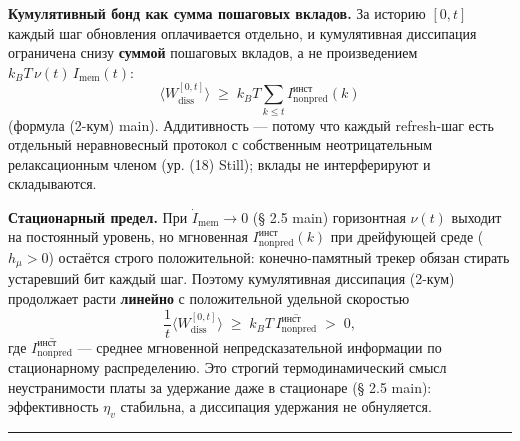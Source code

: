 \documentclass[pdflatex,sn-mathphys-ay]{sn-jnl}
\begin{document}
\textbf{Кумулятивный бонд как сумма пошаговых вкладов.} За историю \([0,t]\) каждый шаг обновления оплачивается отдельно, и кумулятивная диссипация ограничена снизу \textbf{суммой} пошаговых вкладов, а не произведением \(k_B T\,\nu(t)\, I_{\text{mem}}(t)\): \[\Big\langle W_{\text{diss}}^{[0,t]}\Big\rangle \;\ge\; k_B T \sum_{k \le t} I_{\text{nonpred}}^{\text{инст}}(k)\] (формула (2-кум) main). Аддитивность --- потому что каждый refresh-шаг есть отдельный неравновесный протокол с собственным неотрицательным релаксационным членом (ур. (18) Still); вклады не интерферируют и складываются.



\textbf{Стационарный предел.} При \(\dot I_{\text{mem}} \to 0\) (§ 2.5 main) горизонтная \(\nu(t)\) выходит на постоянный уровень, но мгновенная \(I_{\text{nonpred}}^{\text{инст}}(k)\) при дрейфующей среде (\(h_\mu > 0\)) остаётся строго положительной: конечно-памятный трекер обязан стирать устаревший бит каждый шаг. Поэтому кумулятивная диссипация (2-кум) продолжает расти \textbf{линейно} с положительной удельной скоростью \[\frac{1}{t}\Big\langle W_{\text{diss}}^{[0,t]}\Big\rangle \;\ge\; k_B T\, \overline{I_{\text{nonpred}}^{\text{инст}}} \;>\; 0,\] где \(\overline{I_{\text{nonpred}}^{\text{инст}}}\) --- среднее мгновенной непредсказательной информации по стационарному распределению. Это строгий термодинамический смысл неустранимости платы за удержание даже в стационаре (§ 2.5 main): эффективность \(\eta_v\) стабильна, а диссипация удержания не обнуляется.



\begin{center}\rule{0.5\linewidth}{0.5pt}\end{center}



\nocite{*}

\end{document}
